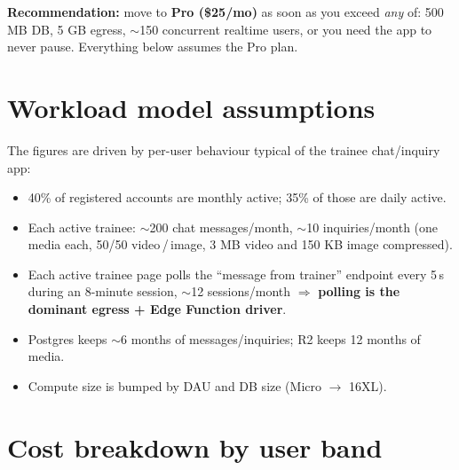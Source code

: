 \documentclass[11pt]{article}
\begin{document}
\textbf{Recommendation:} move to \textbf{Pro (\$25/mo)} as soon as you exceed \emph{any} of: 500 MB DB, 5 GB egress, $\sim$150 concurrent realtime users, or you need the app to never pause. Everything below assumes the Pro plan.

\section{Workload model assumptions}

The figures are driven by per-user behaviour typical of the trainee chat/inquiry app:

\begin{itemize}[leftmargin=*,itemsep=2pt]
\item 40\% of registered accounts are monthly active; 35\% of those are daily active.
\item Each active trainee: $\sim$200 chat messages/month, $\sim$10 inquiries/month (one media each, 50/50 video\,/\,image, 3 MB video and 150 KB image compressed).
\item Each active trainee page polls the ``message from trainer'' endpoint every 5\,s during an 8-minute session, $\sim$12 sessions/month $\Rightarrow$ \textbf{polling is the dominant egress + Edge Function driver}.
\item Postgres keeps $\sim$6 months of messages/inquiries; R2 keeps 12 months of media.
\item Compute size is bumped by DAU and DB size (Micro $\to$ 16XL).
\end{itemize}

\section{Cost breakdown by user band}
\end{document}
